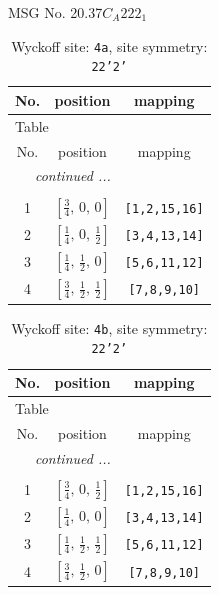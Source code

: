 \documentclass[fleqn,8pt]{jsarticle}
\begin{document}
\setcounter{MaxMatrixCols}{32}

\renewcommand{\tablename}{Table~}
\renewcommand{\figurename}{Figure~}
\begin{center}
\LARGE
MSG No. 20.37\quad$C_{A}222_{1}$
\end{center}
\renewcommand{\arraystretch}{1.2}
\begin{longtable}{ccc}
\caption{Wyckoff site: {\tt 4a}, site symmetry: {\tt 22'2'}}
 \\
 \hline \hline
No. & position & mapping \\ \hline \endfirsthead

\multicolumn{2}{l}{\tablename\ \thetable{}} \\
 \hline \hline
No. & position & mapping \\ \hline \endhead

 \hline \hline
\multicolumn{2}{r}{\footnotesize\it continued ...} \\ \endfoot

 \hline \hline
\multicolumn{2}{r}{} \\ \endlastfoot

1 & $\left[ \frac{3}{4},\, 0,\, 0 \right]$ & {\tt [1,2,15,16]} \\ \hline
2 & $\left[ \frac{1}{4},\, 0,\, \frac{1}{2} \right]$ & {\tt [3,4,13,14]} \\ \hline
3 & $\left[ \frac{1}{4},\, \frac{1}{2},\, 0 \right]$ & {\tt [5,6,11,12]} \\ \hline
4 & $\left[ \frac{3}{4},\, \frac{1}{2},\, \frac{1}{2} \right]$ & {\tt [7,8,9,10]} \\
\end{longtable}
\renewcommand{\arraystretch}{1.2}
\begin{longtable}{ccc}
\caption{Wyckoff site: {\tt 4b}, site symmetry: {\tt 22'2'}}
 \\
 \hline \hline
No. & position & mapping \\ \hline \endfirsthead

\multicolumn{2}{l}{\tablename\ \thetable{}} \\
 \hline \hline
No. & position & mapping \\ \hline \endhead

 \hline \hline
\multicolumn{2}{r}{\footnotesize\it continued ...} \\ \endfoot

 \hline \hline
\multicolumn{2}{r}{} \\ \endlastfoot

1 & $\left[ \frac{3}{4},\, 0,\, \frac{1}{2} \right]$ & {\tt [1,2,15,16]} \\ \hline
2 & $\left[ \frac{1}{4},\, 0,\, 0 \right]$ & {\tt [3,4,13,14]} \\ \hline
3 & $\left[ \frac{1}{4},\, \frac{1}{2},\, \frac{1}{2} \right]$ & {\tt [5,6,11,12]} \\ \hline
4 & $\left[ \frac{3}{4},\, \frac{1}{2},\, 0 \right]$ & {\tt [7,8,9,10]} \\
\end{longtable}
\end{document}
